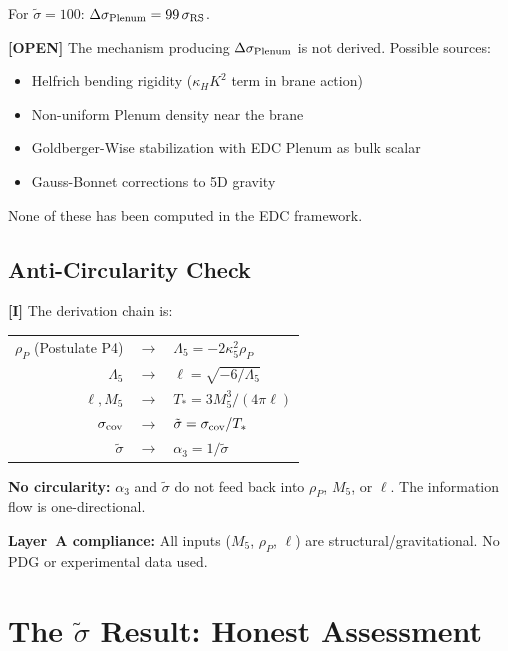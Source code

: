 \documentclass[11pt,a4paper]{article}
\newcommand{\tagI}{\textcolor{mathpurple}{\textbf{[I]}}}
\newcommand{\tagOPEN}{\textcolor{openred}{\textbf{[OPEN]}}}
\theoremstyle{definition}
\theoremstyle{remark}
\begin{document}
For $\tilde\sigma = 100$: $\Delta\sigma_{\rm Plenum} = 99\,\sigma_{\rm RS}$.

\tagOPEN{} The mechanism producing $\Delta\sigma_{\rm Plenum}$ is not
derived. Possible sources:
\begin{itemize}
\item Helfrich bending rigidity ($\kappa_H K^2$ term in brane action)
\item Non-uniform Plenum density near the brane
\item Goldberger-Wise stabilization with EDC Plenum as bulk scalar
\item Gauss-Bonnet corrections to 5D gravity
\end{itemize}

None of these has been computed in the EDC framework.

\subsection{Anti-Circularity Check}

\tagI{} The derivation chain is:
\begin{center}
\begin{tabular}{rcl}
$\rho_P$ (Postulate P4) & $\to$ & $\Lambda_5 = -2\kappa_5^2\rho_P$ \\
$\Lambda_5$ & $\to$ & $\ell = \sqrt{-6/\Lambda_5}$ \\
$\ell, M_5$ & $\to$ & $T_* = 3M_5^3/(4\pi\ell)$ \\
$\sigma_{\rm cov}$ & $\to$ & $\tilde\sigma = \sigma_{\rm cov}/T_*$ \\
$\tilde\sigma$ & $\to$ & $\alpha_3 = 1/\tilde\sigma$ \\
\end{tabular}
\end{center}

\textbf{No circularity:} $\alpha_3$ and $\tilde\sigma$ do not feed back
into $\rho_P$, $M_5$, or $\ell$. The information flow is one-directional.

\textbf{Layer~A compliance:} All inputs ($M_5$, $\rho_P$, $\ell$) are
structural/gravitational. No PDG or experimental data used.

\section{The $\tilde\sigma$ Result: Honest Assessment}
\label{sec:result}
\end{document}
